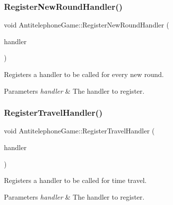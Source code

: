 \subsubsection{\texorpdfstring{Register\+New\+Round\+Handler()}{RegisterNewRoundHandler()}}
{\footnotesize\ttfamily void Antitelephone\+Game\+::\+Register\+New\+Round\+Handler (\begin{DoxyParamCaption}\item[{\hyperlink{class_antitelephone_game_a8133e046c3f00cf8b1b056c6e67666c9}{New\+Round\+Handler}}]{handler }\end{DoxyParamCaption})}



Registers a handler to be called for every new round. 


\begin{DoxyParams}{Parameters}
{\em handler} & The handler to register. \\
\hline
\end{DoxyParams}
\mbox{\label{class_antitelephone_game_acd72999c2c8111ed929f93e7f40b88d1}} 
\subsubsection{\texorpdfstring{Register\+Travel\+Handler()}{RegisterTravelHandler()}}
{\footnotesize\ttfamily void Antitelephone\+Game\+::\+Register\+Travel\+Handler (\begin{DoxyParamCaption}\item[{\hyperlink{class_antitelephone_game_af20c5801994054663bdb537b40c6683d}{Travel\+Handler}}]{handler }\end{DoxyParamCaption})}



Registers a handler to be called for time travel. 


\begin{DoxyParams}{Parameters}
{\em handler} & The handler to register. \\
\hline
\end{DoxyParams}
\mbox{\label{class_antitelephone_game_a2bf00100f24cb1ba9291d358314a8ee8}} 
